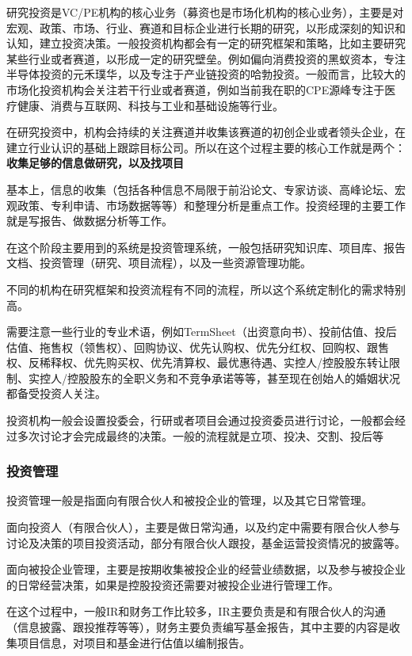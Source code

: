\documentclass[
]{article}
\begin{document}
研究投资是VC/PE机构的核心业务（募资也是市场化机构的核心业务），主要是对宏观、政策、市场、行业、赛道和目标企业进行长期的研究，以形成深刻的知识和认知，建立投资决策。一般投资机构都会有一定的研究框架和策略，比如主要研究某些行业或者赛道，以形成一定的研究壁垒。例如偏向消费投资的黑蚁资本，专注半导体投资的元禾璞华，以及专注于产业链投资的哈勃投资。一般而言，比较大的市场化投资机构会关注若干行业或者赛道，例如当前我在职的CPE源峰专注于医疗健康、消费与互联网、科技与工业和基础设施等行业。

在研究投资中，机构会持续的关注赛道并收集该赛道的初创企业或者领头企业，在建立行业认识的基础上跟踪目标公司。所以在这个过程主要的核心工作就是两个：\textbf{收集足够的信息做研究，以及找项目}

基本上，信息的收集（包括各种信息不局限于前沿论文、专家访谈、高峰论坛、宏观政策、专利申请、市场数据等等）和整理分析是重点工作。投资经理的主要工作就是写报告、做数据分析等工作。

在这个阶段主要用到的系统是投资管理系统，一般包括研究知识库、项目库、报告文档、投资管理（研究、项目流程），以及一些资源管理功能。

不同的机构在研究框架和投资流程有不同的流程，所以这个系统定制化的需求特别高。

需要注意一些行业的专业术语，例如TermSheet（出资意向书）、投前估值、投后估值、拖售权（领售权）、回购协议、优先认购权、优先分红权、回购权、跟售权、反稀释权、优先购买权、优先清算权、最优惠待遇、实控人/控股股东转让限制、实控人/控股股东的全职义务和不竞争承诺等等，甚至现在创始人的婚姻状况都备受投资人关注。

投资机构一般会设置投委会，行研或者项目会通过投资委员进行讨论，一般都会经过多次讨论才会完成最终的决策。一般的流程就是立项、投决、交割、投后等

\hypertarget{ux6295ux8d44ux7ba1ux7406}{%
\subsubsection{投资管理}\label{ux6295ux8d44ux7ba1ux7406}}

投资管理一般是指面向有限合伙人和被投企业的管理，以及其它日常管理。

面向投资人（有限合伙人），主要是做日常沟通，以及约定中需要有限合伙人参与讨论及决策的项目投资活动，部分有限合伙人跟投，基金运营投资情况的披露等。

面向被投企业管理，主要是按期收集被投企业的经营业绩数据，以及参与被投企业的日常经营决策，如果是控股投资还需要对被投企业进行管理工作。

在这个过程中，一般IR和财务工作比较多，IR主要负责是和有限合伙人的沟通（信息披露、跟投推荐等等），财务主要负责编写基金报告，其中主要的内容是收集项目信息，对项目和基金进行估值以编制报告。
\end{document}
